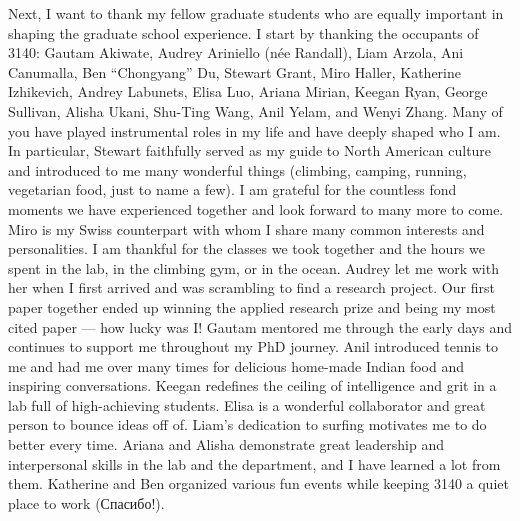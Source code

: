 \begin{acknowledgements}
Next, I want to thank my fellow graduate students who are equally important in shaping the graduate school experience. 
I start by thanking the occupants of 3140: Gautam Akiwate, Audrey Ariniello (née Randall), Liam Arzola, Ani Canumalla, Ben ``Chongyang'' Du, Stewart Grant, Miro Haller, Katherine Izhikevich, Andrey Labunets, Elisa Luo, Ariana Mirian, Keegan Ryan, George Sullivan, Alisha Ukani, Shu-Ting Wang, Anil Yelam, and Wenyi Zhang.  
Many of you have played instrumental roles in my life and have deeply shaped who I am. In particular, Stewart faithfully served as my guide to North American culture and introduced to me many wonderful things (climbing, camping, running, vegetarian food, just to name a few). I am grateful for the countless fond moments we have experienced together and look forward to many more to come. Miro is my Swiss counterpart with whom I share many common interests and personalities. I am thankful for the classes we took together and the hours we spent in the lab, in the climbing gym, or in the ocean. Audrey let me work with her when I first arrived and was scrambling to find a research project. Our first paper together ended up winning the applied research prize and being my most cited paper --- how lucky was I! Gautam mentored me through the early days and continues to support me throughout my PhD journey. Anil introduced tennis to me and had me over many times for delicious home-made Indian food and inspiring conversations. Keegan redefines the ceiling of intelligence and grit in a lab full of high-achieving students. Elisa is a wonderful collaborator and great person to bounce ideas off of. Liam's dedication to surfing motivates me to do better every time. Ariana and Alisha demonstrate great leadership and interpersonal skills in the lab and the department, and I have learned a lot from them. Katherine and Ben organized various fun events while keeping 3140 a quiet place to work ({Спасибо}!).


\end{acknowledgements}
